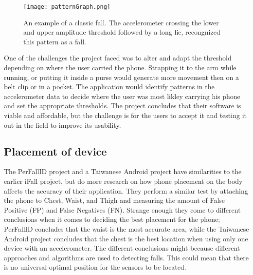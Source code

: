 \begin{figure}[h!]
  \centering
    \texttt{[image: patternGraph.png]}
    \caption{\footnotesize An example of a classic fall. The accelerometer crossing the lower and upper amplitude  threshold followed by a long lie, recongnized this pattern as a fall.}
\end{figure}

One of the challenges the project faced was to alter and adapt the threshold depending on where the user carried the phone. Strapping it to the arm while running, or putting it inside a purse would generate more movement then on a belt clip or in a pocket. The application would identify patterns in the accelerometer data to decide where the user was most likley carrying his phone and set the appropriate thresholds. The project concludes that their software is viable and affordable, but the challenge is for the users to accept it and testing it out in the field to improve its usability.

\subsection{Placement of device}

The PerFallID\cite{fallPrevention} project and a Taiwanese Android\cite{mobilePhoneBasedFallDetection} project have similarities to the earlier iFall project, but do more research on how phone placement on the body affects the accuracy of their application. They perform a similar test by attaching the phone to Chest, Waist, and Thigh and measuring the amount of False Positive (FP) and False Negatives (FN). Strange enough they come to different conclusions when it comes to deciding the best placement for the phone; PerFallID concludes that the waist is the most accurate area, while the Taiwanese Android project concludes that the chest is the best location when using only one device with an accelerometer. The different conclusions might because different approaches and algorithms are used to detecting falls. This could mean that there is no universal optimal position for the sensors to be located.


